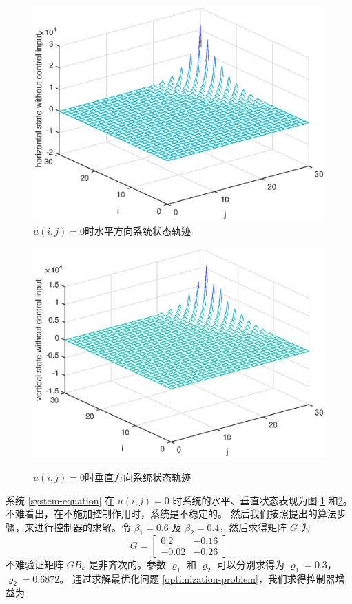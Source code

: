 	\begin{figure}[!htb]
		\centering\includegraphics[scale=0.6]{./figures/2dsmc/simulations/hx-no-controll-input.eps}
		\caption{  $u(i,j)=0$时水平方向系统状态轨迹}
		\label{fig3}
	\end{figure}
	\begin{figure}[!htb]
		\centering\includegraphics[scale=0.6]{./figures/2dsmc/simulations/vx-no-controll-input.eps}\\ 
		\caption{ $u(i,j)=0$时垂直方向系统状态轨迹}
		\label{fig4}
	\end{figure}
	系统 \eqref{system-equation} 在 $u(i,j) = 0$ 时系统的水平、垂直状态表现为图  \ref{fig3} 和\ref{fig4}。 不难看出，在不施加控制作用时，系统是不稳定的。
	然后我们按照提出的算法步骤，来进行控制器的求解。令 $\beta_{1}=0.6$ 及 $\beta_{2}=0.4$，然后求得矩阵 $G$ 为
	\begin{equation*}
	G=\begin{bmatrix}
	0.2&-0.16\\
	-0.02&-0.26
	\end{bmatrix}
	\end{equation*}
	不难验证矩阵 $GB_{k}$ 是非齐次的。参数 $\varrho_{1}$ 和 $\varrho_{2}$ 可以分别求得为 $\varrho_{1}=0.3$， $\varrho_{2}=0.6872$。 通过求解最优化问题 \eqref{optimization-problem}，我们求得控制器增益为\\
	
